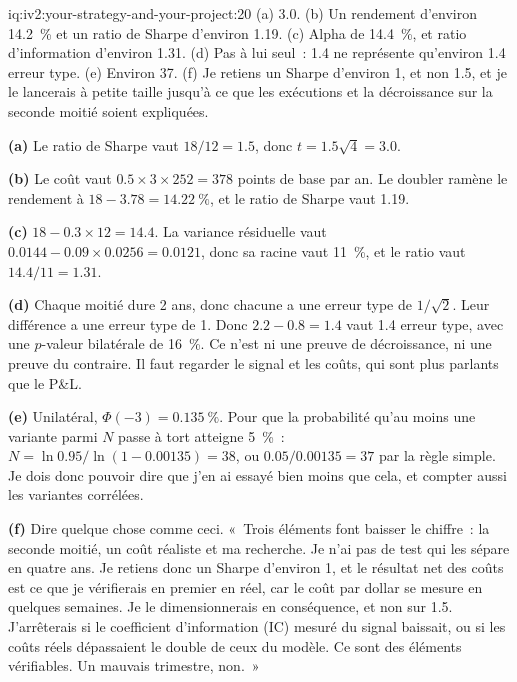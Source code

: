 \begin{solution}{iq:iv2:your-strategy-and-your-project:20}
(a) 3.0. (b) Un rendement d'environ 14.2~\% et un ratio de Sharpe d'environ 1.19. (c) Alpha de 14.4~\%, et ratio d'information d'environ 1.31. (d) Pas à lui seul~: 1.4 ne représente qu'environ 1.4 erreur type. (e) Environ 37. (f) Je retiens un Sharpe d'environ 1, et non 1.5, et je le lancerais à petite taille jusqu'à ce que les exécutions et la décroissance sur la seconde moitié soient expliquées.

\textbf{(a)} Le ratio de Sharpe vaut $18/12 = 1.5$, donc $t = 1.5\sqrt{4} = 3.0$.

\textbf{(b)} Le coût vaut $0.5 \times 3 \times 252 = 378$ points de base par an. Le doubler ramène le rendement à $18 - 3.78 = 14.22~\%$, et le ratio de Sharpe vaut 1.19.

\textbf{(c)} $18 - 0.3 \times 12 = 14.4$. La variance résiduelle vaut $0.0144 - 0.09 \times 0.0256 = 0.0121$, donc sa racine vaut 11~\%, et le ratio vaut $14.4/11 = 1.31$.

\textbf{(d)} Chaque moitié dure 2 ans, donc chacune a une erreur type de $1/\sqrt{2}$. Leur différence a une erreur type de 1. Donc $2.2 - 0.8 = 1.4$ vaut 1.4 erreur type, avec une $p$-valeur bilatérale de 16~\%. Ce n'est ni une preuve de décroissance, ni une preuve du contraire. Il faut regarder le signal et les coûts, qui sont plus parlants que le P\&L.

\textbf{(e)} Unilatéral, $\Phi(-3) = 0.135~\%$. Pour que la probabilité qu'au moins une variante parmi $N$ passe à tort atteigne 5~\%~: $N = \ln 0.95/\ln(1 - 0.00135) = 38$, ou $0.05/0.00135 = 37$ par la règle simple. Je dois donc pouvoir dire que j'en ai essayé bien moins que cela, et compter aussi les variantes corrélées.

\textbf{(f)} Dire quelque chose comme ceci. «~Trois éléments font baisser le chiffre~: la seconde moitié, un coût réaliste et ma recherche. Je n'ai pas de test qui les sépare en quatre ans. Je retiens donc un Sharpe d'environ 1, et le résultat net des coûts est ce que je vérifierais en premier en réel, car le coût par dollar se mesure en quelques semaines. Je le dimensionnerais en conséquence, et non sur 1.5. J'arrêterais si le coefficient d'information (IC) mesuré du signal baissait, ou si les coûts réels dépassaient le double de ceux du modèle. Ce sont des éléments vérifiables. Un mauvais trimestre, non.~»

\end{solution}
